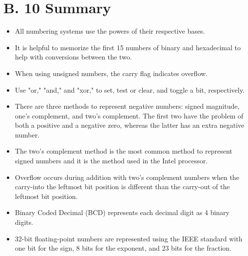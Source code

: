\documentclass[10pt]{article}
\begin{document}
\section*{B. 10 Summary}
\begin{itemize}
  \item All numbering systems use the powers of their respective bases.
  \item It is helpful to memorize the first 15 numbers of binary and hexadecimal to help with conversions between the two.
  \item When using unsigned numbers, the carry flag indicates overflow.
  \item Use "or," "and," and "xor," to set, test or clear, and toggle a bit, respectively.
  \item There are three methods to represent negative numbers: signed magnitude, one's complement, and two's complement. The first two have the problem of both a positive and a negative zero, whereas the latter has an extra negative number.
  \item The two's complement method is the most common method to represent signed numbers and it is the method used in the Intel processor.
  \item Overflow occurs during addition with two's complement numbers when the carry-into the leftmost bit position is different than the carry-out of the leftmost bit position.
  \item Binary Coded Decimal (BCD) represents each decimal digit as 4 binary digits.
  \item 32-bit floating-point numbers are represented using the IEEE standard with one bit for the sign, 8 bits for the exponent, and 23 bits for the fraction.
\end{itemize}
\end{document}
